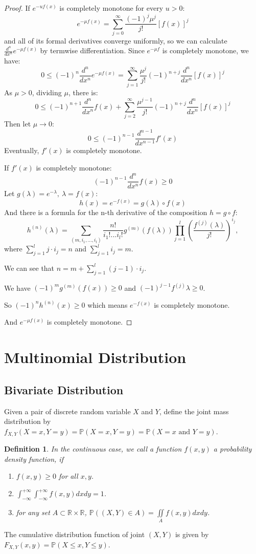 \documentclass[11pt]{article}
\def\BP{{\bf P}}
\def\BR{{\mathbb R}}
\def\BP{{\mathbb P}}
\newtheorem{definition}{Definition}[section]
\begin{document}
\begin{proof}
If $e^{-uf(x)}$ is completely monotone for every $u>0$:
\[e^{-\mu f(x)} = \sum_{j=0}^{\infty}\frac{(-1)^j\mu^j}{j!}[f(x)]^j\] and all of its formal derivatives converge uniformly, so we can calculate $\frac{d^n}{dx^n}e^{-\mu f(x)}$ by termwise differentiation.
Since $e^{-\mu f}$ is completely monotone, we have:
\[0\le(-1)^n\frac{d^n}{dx^n}e^{-\mu f(x)} = \sum_{j=1}^{\infty}\frac{\mu^j}{j!}(-1)^{n+j}\frac{d^n}{dx^n}[f(x)]^j\]
As $\mu > 0$, dividing $\mu$, there is:
\[0\le(-1)^{n+1}\frac{d^n}{dx^n}f(x)+\sum_{j=2}^{\infty}\frac{\mu^{j-1}}{j!}(-1)^{n+j}\frac{d^n}{dx^n}[f(x)]^j\]
Then let $\mu \rightarrow 0$:
\[0\le(-1)^{n-1}\frac{d^{n-1}}{dx^{n-1}}f'(x)\]
Eventually, $f'(x)$ is completely monotone.

If $f'(x)$ is completely monotone:
\[(-1)^{n-1}\frac{d^n}{dx^n}f(x)\ge0\]
Let $g(\lambda) = e^{-\lambda},~ \lambda = f(x)$:
\[h(x) = e^{- f(x)} = g(\lambda)\circ f(x)\]
And there is a formula for the n-th derivative of the composition $h = g\circ f$:
\[h^{(n)}(\lambda) = \sum_{(m,i_1,...,i_l)}^{}\frac{n!}{i_1!...i_l!}g^{(m)}(f(\lambda))\prod_{j=1}^{l}(\frac{f^{(j)}(\lambda)}{j!})^{i_j},\]
where $\sum_{j=1}^{l}j\cdot i_j = n$ and $\sum_{j=1}^{l}i_j = m$.

We can see that $n = m + \sum_{j=1}^{l}(j-1)\cdot i_j$.

We have $(-1)^mg^{(m)}(f(x)) \ge 0$ and $(-1)^{j-1}f^{(j)}\lambda \ge 0$. 

So $(-1)^nh^{(n)}(x) \ge 0$ which means $e^{-f(x)}$ is completely monotone.

And $e^{-\mu f(x)}$ is completely monotone.


\end{proof}


\section{Multinomial Distribution}

\subsection{Bivariate Distribution}
Given a pair of discrete random variable $X$ and $Y$, define the joint mass distribution by $f_{X,Y}(X=x, Y=y) = \BP(X=x, Y=y) = \BP(X=x \text{ and } Y = y)$.

\begin{definition}
In the continuous case, we call a function $f(x,y)$ a probability density function, if
\begin{enumerate}
\item $f(x,y) \geq 0$ for all $x, y$.
\item $\int_{-\infty}^{+\infty}\int_{-\infty}^{+\infty} f(x,y) dxdy = 1$.
\item for any set $A \subset \BR \times \BR$, $\BP((X,Y) \in A) = \iint\limits_A f(x,y) dxdy$. 
\end{enumerate}
\end{definition}
The cumulative distribution function of joint $(X,Y)$ is given by $F_{X,Y} (x, y) = \BP(X \leq x, Y \leq y)$.
\end{document}
